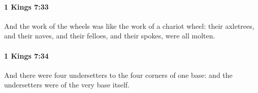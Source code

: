 		\paragraph{1 Kings 7:33} %
			\label{1KINGS-7-33}

			And the work of the wheels was like the work of a chariot wheel: their axletrees, and their naves, and their felloes, and their spokes, were all molten.


		\paragraph{1 Kings 7:34} %
			\label{1KINGS-7-34}

			And there were four undersetters to the four corners of one base: and the undersetters were of the very base itself.


